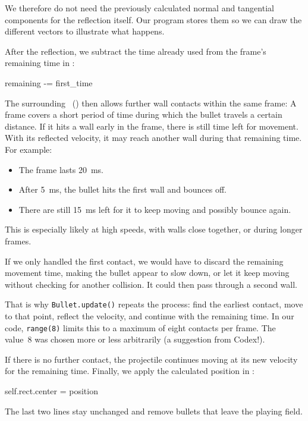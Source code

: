 \begin{hintbox}
	We therefore do not need the previously calculated normal and tangential components for the reflection itself. Our program stores them so we can draw the different vectors to illustrate what happens.
\end{hintbox}


After the reflection, we subtract the time already used from the frame's remaining time in :
\begin{codebox}
	remaining -= first_time
\end{codebox}

The surrounding \forSchleife\ () then allows further wall contacts within the same frame: A frame covers a short period of time during which the bullet travels a certain distance. If it hits a wall early in the frame, there is still time left for movement. With its reflected velocity, it may reach another wall during that remaining time. For example:
\begin{itemize}
	\item The frame lasts \SI{20}{ms}.
	\item After \SI{5}{ms}, the bullet hits the first wall and bounces off.
	\item There are still \SI{15}{ms} left for it to keep moving and possibly bounce again.
\end{itemize}
This is especially likely at high speeds, with walls close together, or during longer frames.

If we only handled the first contact, we would have to discard the remaining movement time, making the bullet appear to slow down, or let it keep moving without checking for another collision. It could then pass through a second wall.

That is why \texttt{Bullet.update()} repeats the process: find the earliest contact, move to that point, reflect the velocity, and continue with the remaining time. In our code, \texttt{range(8)} limits this to a maximum of eight contacts per frame. The value~8 was chosen more or less arbitrarily (a suggestion from Codex!).

If there is no further contact, the projectile continues moving at its new velocity for the remaining time. Finally, we apply the calculated position in :
\begin{codebox}
	self.rect.center = position
\end{codebox}

The last two lines stay unchanged and remove bullets that leave the playing field.

